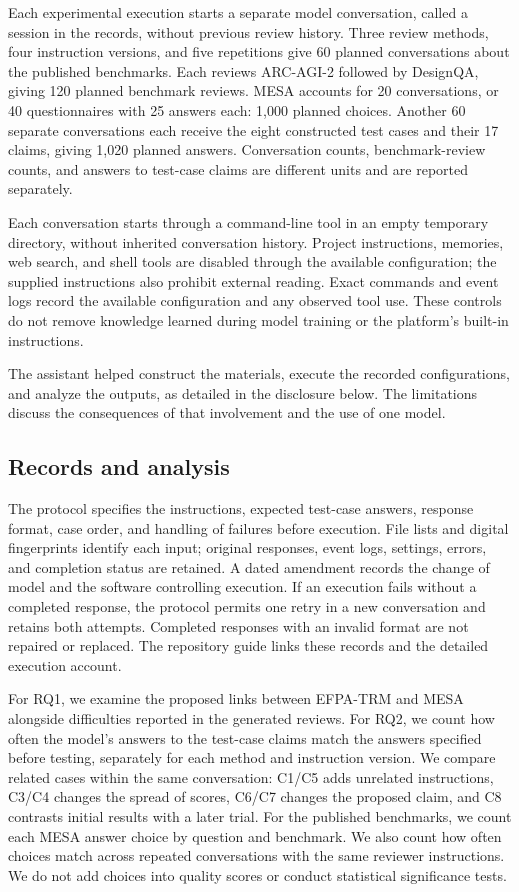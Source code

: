 \documentclass[10pt,conference]{IEEEtran}
\begin{document}
Each experimental execution starts a separate model conversation, called a session in the records, without previous review history. Three review methods, four instruction versions, and five repetitions give 60 planned conversations about the published benchmarks. Each reviews ARC-AGI-2 followed by DesignQA, giving 120 planned benchmark reviews. MESA accounts for 20 conversations, or 40 questionnaires with 25 answers each: 1,000 planned choices. Another 60 separate conversations each receive the eight constructed test cases and their 17 claims, giving 1,020 planned answers. Conversation counts, benchmark-review counts, and answers to test-case claims are different units and are reported separately.

Each conversation starts through a command-line tool in an empty temporary directory, without inherited conversation history. Project instructions, memories, web search, and shell tools are disabled through the available configuration; the supplied instructions also prohibit external reading. Exact commands and event logs record the available configuration and any observed tool use. These controls do not remove knowledge learned during model training or the platform's built-in instructions.

The assistant helped construct the materials, execute the recorded configurations, and analyze the outputs, as detailed in the disclosure below. The limitations discuss the consequences of that involvement and the use of one model.

\subsection{Records and analysis}
The protocol specifies the instructions, expected test-case answers, response format, case order, and handling of failures before execution. File lists and digital fingerprints identify each input; original responses, event logs, settings, errors, and completion status are retained. A dated amendment records the change of model and the software controlling execution. If an execution fails without a completed response, the protocol permits one retry in a new conversation and retains both attempts. Completed responses with an invalid format are not repaired or replaced. The repository guide links these records and the detailed execution account.

For RQ1, we examine the proposed links between EFPA-TRM and MESA alongside difficulties reported in the generated reviews. For RQ2, we count how often the model's answers to the test-case claims match the answers specified before testing, separately for each method and instruction version. We compare related cases within the same conversation: C1/C5 adds unrelated instructions, C3/C4 changes the spread of scores, C6/C7 changes the proposed claim, and C8 contrasts initial results with a later trial. For the published benchmarks, we count each MESA answer choice by question and benchmark. We also count how often choices match across repeated conversations with the same reviewer instructions. We do not add choices into quality scores or conduct statistical significance tests.
\end{document}

